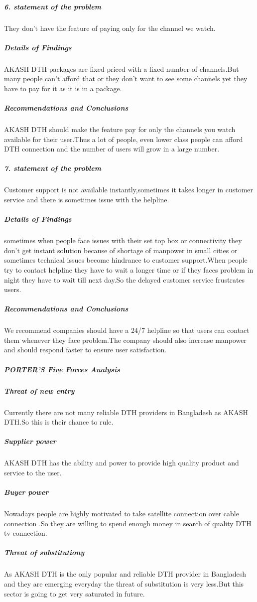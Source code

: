\begin{spacing}{1.0}
\subparagraph{6. statement of the problem}
They don’t have the feature of paying only for the channel we watch.
\subparagraph{Details of Findings}
 AKASH DTH packages are fixed priced with a fixed number of channels.But many people can’t afford that or they don’t want to see some channels yet they have to pay for it as it is in a package.
\subparagraph{Recommendations and Conclusions}
 AKASH DTH should make the feature pay for only the channels you watch available for their user.Thus a lot of people, even lower class people can afford DTH connection and the number of users will grow in a large number.



\subparagraph{7. statement of the problem}
Customer support is not available instantly,sometimes it takes longer in customer service and there is sometimes issue with the helpline.
\subparagraph{Details of Findings}
sometimes when people face issues with their set top box or connectivity they don’t get instant solution because of shortage of manpower in small cities or sometimes technical issues become hindrance to customer support.When people try to contact helpline they have to wait a longer time or if they faces problem in night they have to wait till next day.So the delayed customer service frustrates users.
\subparagraph{Recommendations and Conclusions}
We recommend companies should have a 24/7 helpline so that users can contact them whenever they face problem.The company should also increase manpower and should respond faster to ensure user satisfaction.
 
\subparagraph{PORTER’S Five Forces Analysis}
\subparagraph{Threat of new entry}
Currently there are not many reliable DTH providers in Bangladesh as AKASH DTH.So this is their chance to rule.

\subparagraph{Supplier power}
AKASH DTH has the ability and power to provide high quality product and service to the user.
\subparagraph{Buyer power}
Nowadays people are highly motivated to take satellite connection over cable connection .So they are willing to spend enough money in search of quality DTH tv connection.
\subparagraph{Threat of substitutiony}
As AKASH DTH is the only popular and reliable DTH provider in Bangladesh and they are emerging everyday the threat of substitution is very less.But this sector is going to get very saturated in future.


\end{spacing}
